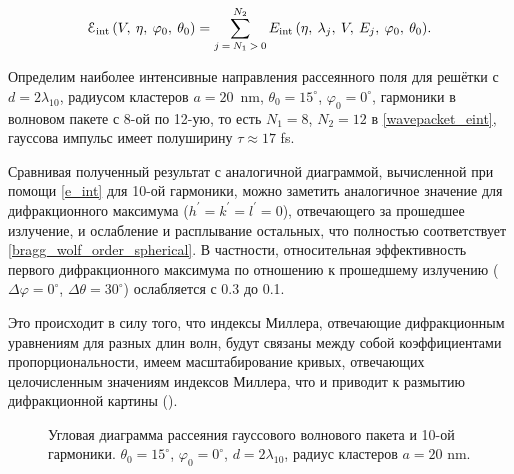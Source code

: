 
    \begin{equation}
        \EuScript{E}_{\textrm{int}} \left(V, \:\eta, \:\varphi_0, \:\theta_0 \right) = \sum\limits_{j\:=\:N_1\:>\:0}^{N_2}{E_{\textrm{int}} \left( \eta,\:\lambda_{j}, \:V, \:E_j, \:\varphi_0, \:\theta_0\right)}.
        \label{wavepacket_eint}
    \end{equation}

Определим наиболее интенсивные направления рассеянного поля для решётки с $d = 2\lambda_{10}$, радиусом кластеров $a = 20$~nm, $\theta_0 = 15^\circ$, $\varphi_0 = 0^\circ$, гармоники в волновом пакете с 8-ой по 12-ую, то есть $N_1 = 8$, $N_2 = 12$ в \autoref{wavepacket_eint}, гауссова импульс имеет полуширину $\tau \approx 17$ fs. 

Сравнивая полученный результат с аналогичной диаграммой, вычисленной при помощи \autoref{e_int} для 10-ой гармоники, можно заметить аналогичное значение для дифракционного максимума ($h^\prime = k^\prime = l^\prime = 0$), отвечающего за прошедшее излучение, и ослабление и расплывание остальных, что полностью соответствует \autoref{bragg_wolf_order_spherical}. В частности, относительная эффективность первого дифракционного максимума по отношению к прошедшему  излучению ($\Delta \varphi = 0^\circ$, $\Delta \theta = 30^\circ$) ослабляется с 0.3 до 0.1.

Это происходит в силу того, что индексы Миллера, отвечающие дифракционным уравнениям для разных длин волн, будут связаны между собой коэффициентами пропорциональности, имеем масштабирование кривых, отвечающих целочисленным значениям индексов Миллера, что и приводит к размытию дифракционной картины ().

    \begin{figure}[ht]
        \hfil
        \caption{Угловая диаграмма рассеяния гауссового волнового пакета и 10-ой гармоники. $\theta_0 = 15^\circ$, $\varphi_0 = 0^\circ$, $d = 2\lambda_{10}$, радиус кластеров $a = 20$ nm.}\label{wavepacket1:image}
    \end{figure}